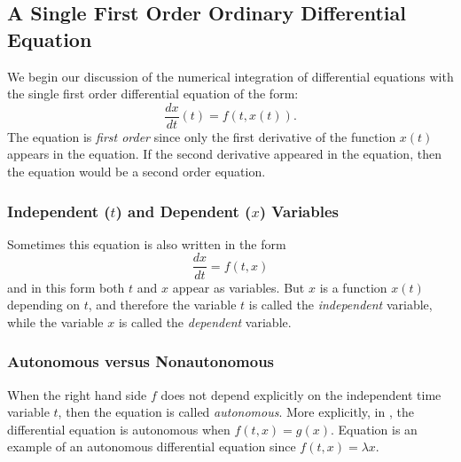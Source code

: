 \documentclass{ximera}
\begin{document}
\subsection*{A Single First Order Ordinary Differential Equation}

We begin our discussion of the numerical integration of
differential equations with the single first order  differential equation
of the form:
\begin{equation} \label{nonaut}
\frac{dx}{dt}(t) = f(t,x(t)).
\end{equation}
The equation is {\em first order\/} since only the first
derivative of the function $x(t)$ appears in the equation. If
the second derivative appeared in the equation, then the equation
would be a second order equation.

\subsubsection*{Independent ($t$) and Dependent ($x$) Variables}

Sometimes this equation is also written in the form
\begin{equation}  \label{nonaut2}
	\frac{dx}{dt} = f(t,x)
\end{equation}
and in this form both $t$ and $x$ appear as variables.  But $x$
is a function $x(t)$ depending on $t$, and therefore the
variable $t$ is called the {\em independent\/}
 variable, while the variable $x$ is
called the {\em dependent\/}  variable.

\subsubsection*{Autonomous versus Nonautonomous}

When the right hand side $f$ does not depend explicitly on the
independent time variable $t$, then the equation is called {\em
autonomous\/}.
More explicitly, in
, the differential equation is autonomous when
$f(t,x)=g(x)$.  Equation  is an example of an
autonomous differential equation since $f(t,x)=\lambda x$.
\end{document}
